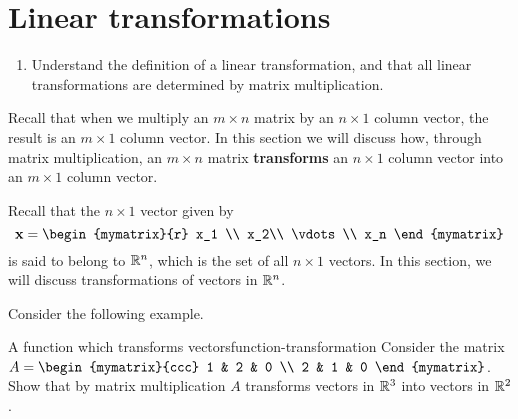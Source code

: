 \section{Linear transformations}

\begin{outcome}
  \begin{enumerate}
  \item Understand the definition of a linear transformation, and that
    all linear transformations are determined by matrix
    multiplication.
  \end{enumerate}
\end{outcome}

Recall that when we multiply an $m\times n$ matrix by an $n\times 1 $
column vector, the result is an $m\times 1$ column vector. In this
section we will discuss how, through matrix multiplication, an $m
\times n$ matrix \textbf{transforms} an $n\times 1$ column vector into
an $m \times 1$ column vector.

Recall that the $n \times 1$ vector given by
\begin{equation*}
\vect{x} = 
\begin{mymatrix}{r}
x_1 \\
x_2\\ 
\vdots \\
x_n
\end{mymatrix}
\end{equation*}
is said to belong to $\mathbb{R}^n$, which is the set of all $n \times 1$ vectors. In this section, we will discuss transformations of vectors in $\mathbb{R}^n$. 

Consider the following example. 

\begin{example}{A function which transforms vectors}{function-transformation}
Consider the matrix $A = \begin{mymatrix}{ccc}
1 & 2 & 0 \\
2 & 1 & 0
\end{mymatrix}$. 
Show that by matrix multiplication $A$ transforms vectors in $\mathbb{R}^3$ into vectors in $\mathbb{R}^2$.
\end{example}

